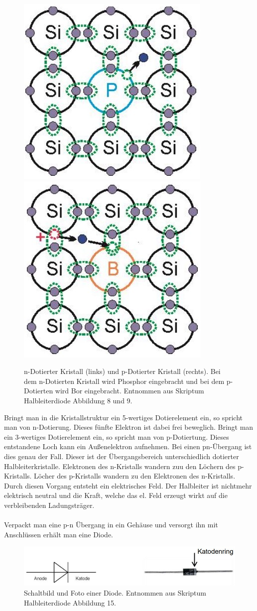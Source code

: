 \documentclass[12pt,a4paper,twoside]{article}
\begin{document}
\begin{figure}[H]
    \centering
    \includegraphics[width=0.3\linewidth,]{nudes/n-dot.jpg}
    \includegraphics[width=0.3\linewidth,]{nudes/p-dot.jpg}
    \caption{n-Dotierter Kristall (links) und p-Dotierter Kristall (rechts). Bei dem n-Dotierten Kristall wird Phosphor eingebracht und bei dem p-Dotierten wird Bor eingebracht. Entnommen aus Skriptum Halbleiterdiode Abbildung 8 und 9. \cite{teachcenter2}}
    \label{fig:n und p dotiert}
\end{figure}

\noindent
Bringt man in die Kristallstruktur ein 5-wertiges Dotierelement ein, so spricht man von n-Dotierung. Dieses fünfte Elektron ist dabei frei beweglich. 
Bringt man ein 3-wertiges Dotierelement ein, so spricht man von p-Dotiertung. Dieses entstandene Loch kann ein Außenelektron aufnehmen. 
Bei einen pn-Übergang ist dies genau der Fall. Dieser ist der Übergangsbereich unterschiedlich dotierter Halbleiterkristalle. 
Elektronen des n-Kristalls wandern zuu den Löchern des p-Kristalls. Löcher des p-Kristalls wandern zu den Elektronen des n-Kristalls. 
Durch diesen Vorgang entsteht ein elektrisches Feld. Der Halbleiter ist nichtmehr elektrisch neutral und die Kraft, welche das el. Feld erzeugt wirkt auf die verbleibenden Ladungsträger. 
\\
\\
Verpackt man eine p-n Übergang in ein Gehäuse und versorgt ihn mit Anschlüssen erhält man eine Diode. 

\begin{figure}[H]
    \centering
    \includegraphics[width=0.6\linewidth,]{nudes/diode.jpg}
    \caption{Schaltbild und Foto einer Diode. Entnommen aus Skriptum Halbleiterdiode Abbildung 15. \cite{teachcenter2}}
    \label{fig:Diode}
\end{figure}
\end{document}
